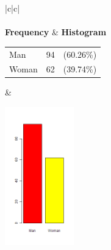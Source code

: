  
 	\begin{center}
	\addtolength{\leftskip}{-4cm}\addtolength{\rightskip}{-4cm}

\begin{tabular}{|c|c|}
\hline
{}\\

\\
\hline
 \textbf{Frequency} & \textbf{Histogram} \\

 \begin{tabular}{@{}l@{ : }cl@{}}

  Man & 94 & (60.26\%) \\

  Woman & 62 & (39.74\%) \\

 \end{tabular}
 & \parbox{3cm}{\includegraphics[width=3cm]{graphUniv1/V-barplot.png}}
 \\
\hline
\end{tabular}
\end{center} 
